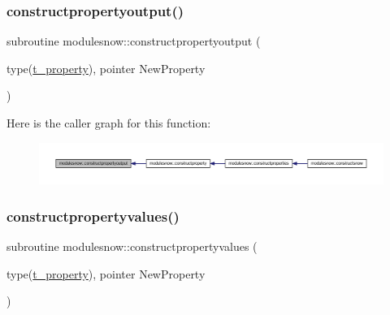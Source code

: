 \subsubsection{\texorpdfstring{constructpropertyoutput()}{constructpropertyoutput()}}
{\footnotesize\ttfamily subroutine modulesnow\+::constructpropertyoutput (\begin{DoxyParamCaption}\item[{type(\mbox{\hyperlink{structmodulesnow_1_1t__property}{t\+\_\+property}}), pointer}]{New\+Property }\end{DoxyParamCaption})\hspace{0.3cm}{\ttfamily [private]}}

Here is the caller graph for this function\+:\nopagebreak
\begin{figure}[H]
\begin{center}
\leavevmode
\includegraphics[width=350pt]{namespacemodulesnow_a70bdbf0fe6f049a855b8643892b060a2_icgraph}
\end{center}
\end{figure}
\mbox{\label{namespacemodulesnow_a6599173ecfbf81367f1afdb4ac9a5c81}} 
\subsubsection{\texorpdfstring{constructpropertyvalues()}{constructpropertyvalues()}}
{\footnotesize\ttfamily subroutine modulesnow\+::constructpropertyvalues (\begin{DoxyParamCaption}\item[{type(\mbox{\hyperlink{structmodulesnow_1_1t__property}{t\+\_\+property}}), pointer}]{New\+Property }\end{DoxyParamCaption})\hspace{0.3cm}{\ttfamily [private]}}

